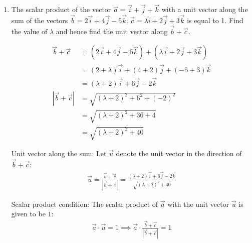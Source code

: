 \begin{enumerate}[label=\thesubsection.\arabic*, ref=\thesubsection.\theenumi]
General solution:
The general solution of a linear differential equation is given by:
\begin{align*}
	y \cdot (\text{I.F.}) = \int Q(x) \cdot (\text{I.F.})\,dx + C
\end{align*}

Substituting the values of $\text{I.F.}$ and $Q(x)$:
\begin{align*}
	y(1 + \sin x) &= \int \left(-\frac{x}{1 + \sin x}\right)(1 + \sin x)\,dx + C \implies
	y(1 + \sin x) = \int (-x)\,dx + C \implies
	y(1 + \sin x) = -\frac{x^2}{2} + C
\end{align*}

Multiplying throughout by $2$:
\begin{align*}
	2y(1 + \sin x) = -x^2 + 2C \implies 2y(1 + \sin x) + x^2 = C'
\end{align*}




\item The scalar product of the vector $\vec a=\vec i+\vec j+\vec k$
with a unit vector along the sum of the vectors $\vec b=2\vec i+4\vec j-5\vec k,\vec c=\lambda\hat i+2\vec j+3\vec k$
is equal to 1. Find the value of $\lambda$ and hence find the unit vector along $\vec b+\vec c$.

\solution
\begin{align*}
	\vec{b} + \vec{c} &= (2\vec{i} + 4\vec{j} - 5\vec{k}) + (\lambda\vec{i} + 2\vec{j} + 3\vec{k}) \\
	&= (2 + \lambda)\vec{i} + (4 + 2)\vec{j} + (-5 + 3)\vec{k} \\
	&= (\lambda + 2)\vec{i} + 6\vec{j} - 2\vec{k} \\
	|\vec{b} + \vec{c}| &= \sqrt{(\lambda + 2)^2 + 6^2 + (-2)^2} \\
	&= \sqrt{(\lambda + 2)^2 + 36 + 4} \\
	&= \sqrt{(\lambda + 2)^2 + 40}
\end{align*}

Unit vector along the sum:
Let $\vec{u}$ denote the unit vector in the direction of $\vec{b} + \vec{c}$:
\begin{align*}
	\vec{u} = \frac{\vec{b} + \vec{c}}{|\vec{b} + \vec{c}|} = \frac{(\lambda + 2)\vec{i} + 6\vec{j} - 2\vec{k}}{\sqrt{(\lambda + 2)^2 + 40}}
\end{align*}

Scalar product condition:
The scalar product of $\vec{a}$ with the unit vector $\vec{u}$ is given to be $1$:
\begin{align*}
	\vec{a} \cdot \vec{u} = 1 \implies \vec{a} \cdot \frac{\vec{b} + \vec{c}}{|\vec{b} + \vec{c}|} = 1
\end{align*}


\end{enumerate}
